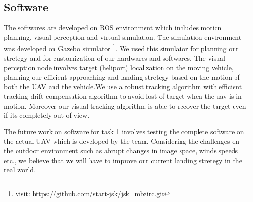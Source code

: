 \documentclass{standalone}
\begin{document}
\subsection{Software}

The softwares are developed on ROS environment which includes motion planning, visual perception and virtual simulation. The simulation environment was developed on Gazebo simulator \footnote{visit: \url{https://github.com/start-jsk/jsk_mbzirc.git}}. We used this simulator for planning our stretegy and for customization of our hardwares and softwares. The visual perception node involves target (heliport) localization on the moving vehicle, planning our efficient approaching and landing stretegy based on the motion of both the UAV and the vehicle.We use a robust tracking algorithm with efficient tracking drift compensation algorithm to avoid lost of target when the uav is in motion. Moreover our visual tracking algorithm is able to recover the target even if its completely out of view. 

The future work on software for task 1 involves testing the complete software on the actual UAV which is developed by the team. Considering the challenges on the outdoor environment such as abrupt changes in image space, winds speeds etc., we believe that we will have to improve our current landing stretegy in the real world. 
\end{document}
